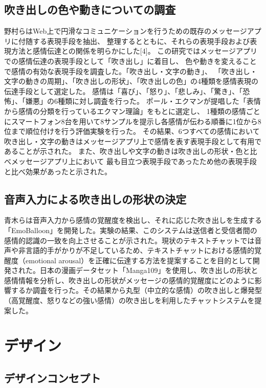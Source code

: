 \documentclass[11pt,a4paper]{ltjsreport}
\begin{document}
    \subsection{吹き出しの色や動きについての調査}
    野村らはWeb上で円滑なコミュニケーションを行うための既存のメッセージアプリに付随する表現手段を抽出、
    整理するとともに、それらの表現手段および表現方法と感情伝達との関係を明らかにした[4]。
    この研究ではメッセージアプリでの感情伝達の表現手段として「吹き出し」に着目し、
    色や動きを変えることで感情の有効な表現手段を調査した。「吹き出し・文字の動き」、
    「吹き出し・文字の動きの周期」、「吹き出しの形状」、「吹き出しの色」の4種類を感情表現の伝達手段として選定した。
    感情は「喜び」、「怒り」、「悲しみ」、「驚き」、「恐怖」、「嫌悪」の6種類に対し調査を行った。
    ポール・エクマンが提唱した「表情から感情の分類を行っているエクマン理論」をもとに選定し、
    1種類の感情ごとにスマートフォン8台を用いて8サンプルを提示し各感情が伝わる順番に1位から8位まで順位付けを行う評価実験を行った。
    その結果、6つすべての感情において吹き出し・文字の動きはメッセージアプリ上で感情を表す表現手段として有用であることが示された。
    また、吹き出しや文字の動きは吹き出しの形状・色と比べメッセージアプリ上において
    最も目立つ表現手段であったため他の表現手段と比べ効果があったと示された。

    \subsection{音声入力による吹き出しの形状の決定}
    青木らは音声入力から感情の覚醒度を検出し、それに応じた吹き出しを生成する「EmoBalloon」を開発した。実験の結果、このシステムは送信者と受信者間の感情的認識の一致を向上させることが示された。現状のテキストチャットでは音声や非言語的手がかりが不足しているため、テキストチャットにおける感情的覚醒度（emotional arousal）を正確に伝達する方法を提案することを目的として開発された。日本の漫画データセット「Manga109」を使用し、吹き出しの形状と感情情報を分析し、吹き出しの形状がメッセージの感情的覚醒度にどのように影響するか調査を行った。その結果から丸型（中立的な感情）の吹き出しと爆発型（高覚醒度、怒りなどの強い感情）の吹き出しを利用したチャットシステムを提案した。

   \section{デザイン}
   \subsection{デザインコンセプト}
\end{document}
